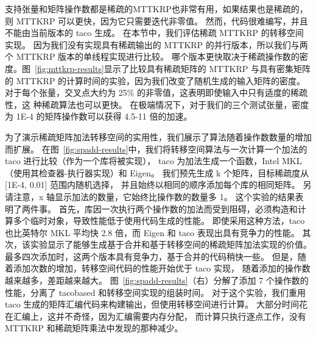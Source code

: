 \begin{translation}
支持张量和矩阵操作数都是稀疏的MTTKRP也非常有用，如果结果也是稀疏的，则 MTTKRP 可以更快，因为它只需要迭代非零值。 然而，代码很难编写，并且不能由当前版本的 taco 生成。 在本节中，我们评估稀疏 MTTKRP 的转移空间实现。 
因为我们没有实现具有稀疏输出的 MTTKRP 的并行版本，所以我们与两个 MTTKRP 版本的单线程实现进行比较。 哪个版本更快取决于稀疏操作数的密度。图~\ref{fig:mttkrp-results}显示了比较具有稀疏矩阵的 MTTKRP 与具有密集矩阵的
MTTKRP 的计算时间的实验，因为我们改变了随机生成的输入矩阵的密度。 对于每个张量，交叉点大约为 25\% 的非零值，这表明即使输入中只有适度的稀疏性，这
种稀疏算法也可以更快。 在极端情况下，对于我们的三个测试张量，密度为 1E-4 的矩阵操作数可以获得 4.5-11 倍的加速。

为了演示稀疏矩阵加法转移空间的实用性，我们展示了算法随着操作数数量的增加而扩展。 在图~\ref{fig:spadd-results}中，我们将转移空间算法与一次计算一个加法的 taco 进行比较（作为一个库将被实现），
taco 为加法生成一个函数，Intel MKL（使用其检查器-执行器实现）和 Eigen。 我们预先生成 k 个矩阵，目标稀疏度从 [1E-4, 0.01] 范围内随机选择，
并且始终以相同的顺序添加每个库的相同矩阵。 另请注意，x 轴显示加法的数量，它始终比操作数的数量多 1。 这个实验的结果表明了两件事。 
首先，库因一次执行两个操作数的加法而受到阻碍，必须构造和计算多个临时对象，导致性能低于使用代码生成的性能。 即使采用这种方法，taco 
也比英特尔 MKL 平均快 2.8 倍，而 Eigen 和 taco 表现出具有竞争力的性能。 其次，该实验显示了能够生成基于合并和基于转移空间的稀疏矩阵加法实现的价值。 
最多四次添加时，这两个版本具有竞争力，基于合并的代码稍快一些。 但是，随着添加次数的增加，转移空间代码的性能开始优于 taco 实现，
随着添加的操作数越来越多，差距越来越大。 图~\ref{fig:spadd-results}（右）分解了添加 7 个操作数的性能，分离了 tacobased 和转移空间实现的组装时间。 
对于这个实验，我们重用 taco 生成的矩阵汇编代码来构建输出，但使用转移空间进行计算。 大部分时间花在汇编上，这并不奇怪，因为汇编需要内存分配，
而计算只执行逐点工作，没有 MTTKRP 和稀疏矩阵乘法中发现的那种减少。


\end{translation}
